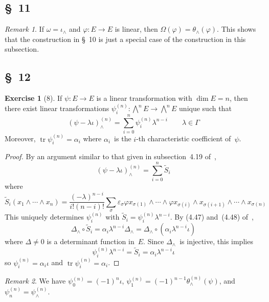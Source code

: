 \documentclass[letterpaper,12pt]{article}
\DeclareMathOperator{\tr}{tr}
\newcommand{\after}{\circ}
\newcommand{\eprod}{\wedge}
\newcommand{\bigeprod}{\bigwedge}
\newcommand{\medeprod}{{\textstyle\bigeprod}}
\newcommand{\multi}[4]{#2_{#3}#1\cdots#1#2_{#4}}
\newcommand{\eprods}[3]{\multi{\eprod}{#1}{#2}{#3}}
\newcommand{\sign}[1]{\varepsilon_{#1}}
\theoremstyle{definition}
\newtheorem*{exer}{Exercise}
\theoremstyle{remark}
\newtheorem*{rmk}{Remark}
\begin{document}
\subsection*{\S~11}
\begin{rmk}
If \(\omega=\iota_{\eprod}\) and \(\varphi:E\to E\) is linear, then \(\Omega(\varphi)=\theta_{\eprod}(\varphi)\). This shows that the construction in \S~10 is just a special case of the construction in this subsection.
\end{rmk}

\subsection*{\S~12}
\begin{exer}[8]
If \(\psi:E\to E\) is a linear transformation with \(\dim E=n\), then there exist linear transformations \(\psi_i^{(n)}:\medeprod^n E\to\medeprod^n E\) unique such that
\[(\psi-\lambda\iota)_{\eprod}^{(n)}=\sum_{i=0}^n\psi_i^{(n)}\lambda^{n-i}\qquad\lambda\in\Gamma\]
Moreover, \(\tr\psi_i^{(n)}=\alpha_i\) where \(\alpha_i\)~is the \(i\)-th characteristic coefficient of~\(\psi\).
\end{exer}
\begin{proof}
By an argument similar to that given in subsection~4.19 of~\cite{greub1},
\[(\psi-\lambda\iota)_{\eprod}^{(n)}=\sum_{i=0}^n\tilde{S}_i\]
where
\[\tilde{S}_i(\eprods{x}{1}{n})=\frac{(-\lambda)^{n-i}}{i!(n-i)!}\sum_{\sigma}\sign{\sigma}\eprods{\varphi x}{\sigma(1)}{\sigma(i)}\eprod\eprods{x}{\sigma(i+1)}{\sigma(n)}\]
This uniquely determines \(\psi_i^{(n)}\) with \(\tilde{S}_i=\psi_i^{(n)}\lambda^{n-i}\). By (4.47) and~(4.48) of~\cite{greub1},
\[\Delta_{\eprod}\after\tilde{S}_i=\alpha_i\lambda^{n-i}\Delta_{\eprod}=\Delta_{\eprod}\after(\alpha_i\lambda^{n-i}\iota)\]
where \(\Delta\ne 0\) is a determinant function in~\(E\). Since \(\Delta_{\eprod}\)~is injective, this implies
\[\psi_i^{(n)}\lambda^{n-i}=\tilde{S}_i=\alpha_i\lambda^{n-i}\iota\]
so \(\psi_i^{(n)}=\alpha_i\iota\) and \(\tr\psi_i^{(n)}=\alpha_i\).
\end{proof}
\begin{rmk}
We have \(\psi_0^{(n)}=(-1)^n\iota\), \(\psi_{1}^{(n)}=(-1)^{n-1}\theta_{\eprod}^{(n)}(\psi)\), and \(\psi_n^{(n)}=\psi_{\eprod}^{(n)}\).
\end{rmk}
\end{document}
